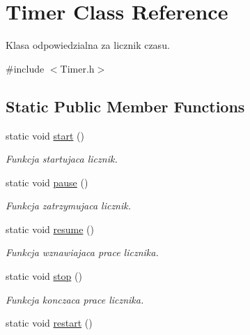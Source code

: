 \hypertarget{class_timer}{}\section{Timer Class Reference}
\label{class_timer}


Klasa odpowiedzialna za licznik czasu.  




{\ttfamily \#include $<$Timer.\+h$>$}

\subsection*{Static Public Member Functions}
\begin{DoxyCompactItemize}
\item 
\hypertarget{class_timer_a3a8b5272198d029779dc9302a54305a8}{}static void \hyperlink{class_timer_a3a8b5272198d029779dc9302a54305a8}{start} ()\label{class_timer_a3a8b5272198d029779dc9302a54305a8}

\begin{DoxyCompactList}\small\item\em Funkcja startujaca licznik. \end{DoxyCompactList}\item 
\hypertarget{class_timer_ab2a6e0b9d6b9c93c06c89ff6dd6291c1}{}static void \hyperlink{class_timer_ab2a6e0b9d6b9c93c06c89ff6dd6291c1}{pause} ()\label{class_timer_ab2a6e0b9d6b9c93c06c89ff6dd6291c1}

\begin{DoxyCompactList}\small\item\em Funkcja zatrzymujaca licznik. \end{DoxyCompactList}\item 
\hypertarget{class_timer_a4ac55a73bb3431db9d4d2fd70ae9a2e8}{}static void \hyperlink{class_timer_a4ac55a73bb3431db9d4d2fd70ae9a2e8}{resume} ()\label{class_timer_a4ac55a73bb3431db9d4d2fd70ae9a2e8}

\begin{DoxyCompactList}\small\item\em Funkcja wznawiajaca prace licznika. \end{DoxyCompactList}\item 
\hypertarget{class_timer_a63f0eb44b27402196590a03781515dba}{}static void \hyperlink{class_timer_a63f0eb44b27402196590a03781515dba}{stop} ()\label{class_timer_a63f0eb44b27402196590a03781515dba}

\begin{DoxyCompactList}\small\item\em Funkcja konczaca prace licznika. \end{DoxyCompactList}\item 
\hypertarget{class_timer_aa3f7871196bb56202af2bc982bfbfff6}{}static void \hyperlink{class_timer_aa3f7871196bb56202af2bc982bfbfff6}{restart} ()\label{class_timer_aa3f7871196bb56202af2bc982bfbfff6}


\end{DoxyCompactItemize}

